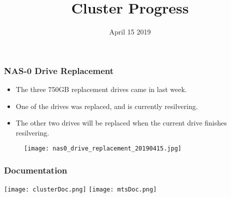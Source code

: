 \documentclass{beamer}
\title{Cluster Progress}
\date{April 15 2019}
\begin{document}

\begin{frame}
  \maketitle
\end{frame}



\begin{frame}
  \frametitle{NAS-0 Drive Replacement}

  \begin{itemize}

  \item The three 750GB replacement drives came in last week.
  \item One of the drives was replaced, and is currently resilvering.
  \item The other two drives will be replaced when the current drive finishes resilvering.

  \end{itemize}

  \begin{figure}[H]
    \begin{center}
      \texttt{[image: nas0\_drive\_replacement\_20190415.jpg]}
    \end{center}
  \end{figure}

\end{frame}



\begin{frame}

  \frametitle{Documentation}

  \begin{center}
    \texttt{[image: clusterDoc.png]}
    \vspace{2cm}
    \texttt{[image: mtsDoc.png]}
  \end{center}

\end{frame}

\end{document}
